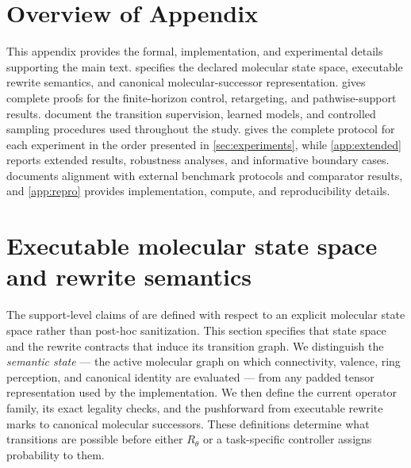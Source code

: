 %

\section*{Overview of Appendix}

This appendix provides the formal, implementation, and experimental details supporting the main text.  specifies the declared molecular state space, executable rewrite semantics, and canonical molecular-successor representation.  gives complete proofs for the finite-horizon control, retargeting, and pathwise-support results.  document the transition supervision, learned models, and controlled sampling procedures used throughout the study.  gives the complete protocol for each experiment in the order presented in \cref{sec:experiments}, while \cref{app:extended} reports extended results, robustness analyses, and informative boundary cases.  documents alignment with external benchmark protocols and comparator results, and \cref{app:repro} provides implementation, compute, and reproducibility details.

\section{Executable molecular state space and rewrite semantics}
\label{app:statespace}

The support-level claims of \method{} are defined with respect to an explicit molecular state space rather than post-hoc sanitization. This section specifies that state space and the rewrite contracts that induce its transition graph. We distinguish the \emph{semantic state} --- the active molecular graph on which connectivity, valence, ring perception, and canonical identity are evaluated --- from any padded tensor representation used by the implementation. We then define the current operator family, its exact legality checks, and the pushforward from executable rewrite marks to canonical molecular successors. These definitions determine what transitions are possible before either $R_\theta$ or a task-specific controller assigns probability to them.

